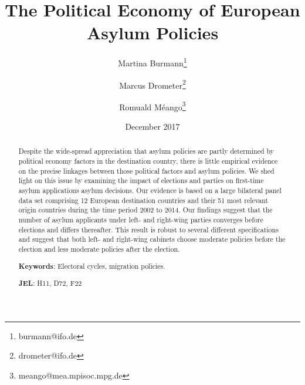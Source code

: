 \documentclass[a4paper,12pt]{article}
\title{The Political Economy of European Asylum Policies}
\date{December 2017}
\author[,1]{Martina Burmann\thanks{burmann@ifo.de}}
\author[,1]{Marcus Drometer\thanks{drometer@ifo.de}}
\author[,2]{Romuald M\'eango\thanks{meango@mea.mpisoc.mpg.de}}
\affil[1]{ifo Institute for Economic Research, Munich}
\affil[2]{Munich Center for the Economics of Aging (MEA)}
\begin{document}
      \maketitle

\begin{center}

\end{center}
\begin{abstract}
\singlespacing
\noindent 
Despite the wide-spread appreciation that asylum policies are partly determined by political economy factors in the destination country, there is little empirical evidence on the precise linkages between those political factors and asylum policies. We shed light on this issue by examining the impact of elections and parties on first-time asylum applications asylum decisions.  Our evidence is based on a large bilateral panel data set comprising 12 European destination countries and their 51 most relevant origin countries during the time period 2002 to 2014. Our findings suggest that  the number of asylum applicants under left- and right-wing parties converges before elections and differs thereafter. This result is robust to several different specifications and suggest that both left- and right-wing cabinets choose moderate policies before the election and less moderate policies after the election.

\bigskip

\textbf{Keywords}: Electoral cycles, migration policies.

\textbf{JEL}: H11, D72, F22

\bigskip
\end{abstract}
\setcounter{page}{0} \renewcommand{\thepage}{}
\pagebreak{}\pagebreak

\end{document}
